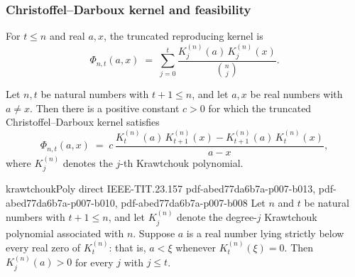 \subsubsection{Christoffel--Darboux kernel and feasibility}

\begin{definition}
\label{cdKernel}
\leanok
{}
For $t \le n$ and real $a, x$, the truncated reproducing kernel is
\[
  \Phi_{n,t}(a,x) \;=\; \sum_{j=0}^{t} \frac{K_j^{(n)}(a)\,K_j^{(n)}(x)}{\binom{n}{j}}.
\]
\end{definition}

\begin{theorem}
\label{cd_identity}
\leanok
{}
Let $n, t$ be natural numbers with $t + 1 \le n$, and let $a, x$ be real numbers with $a
\ne x$. Then there is a positive constant $c > 0$ for which the truncated
Christoffel–Darboux kernel satisfies
\[
\Phi_{n,t}(a,x) \;=\; c\,\frac{K_t^{(n)}(a)\,K_{t+1}^{(n)}(x) -
K_{t+1}^{(n)}(a)\,K_t^{(n)}(x)}{a - x},
\]
where $K_j^{(n)}$ denotes the $j$-th Krawtchouk polynomial.
\end{theorem}

\begin{theorem}
\label{krawtchouk_positive_below_smallest_zero}
\proofstep
  {krawtchoukPoly}
  {direct}
  {IEEE-TIT.23.157}
  {pdf-abed77da6b7a-p007-b013,
    pdf-abed77da6b7a-p007-b010,
    pdf-abed77da6b7a-p007-b008}
Let $n$ and $t$ be natural numbers with $t + 1 \le n$, and let $K_j^{(n)}$ denote the
degree-$j$ Krawtchouk polynomial associated with $n$. Suppose $a$ is a real number lying
strictly below every real zero of $K_t^{(n)}$: that is, $a < \xi$ whenever
$K_t^{(n)}(\xi) = 0$. Then $K_j^{(n)}(a) > 0$ for every $j$ with $j \le t$.
\end{theorem}

